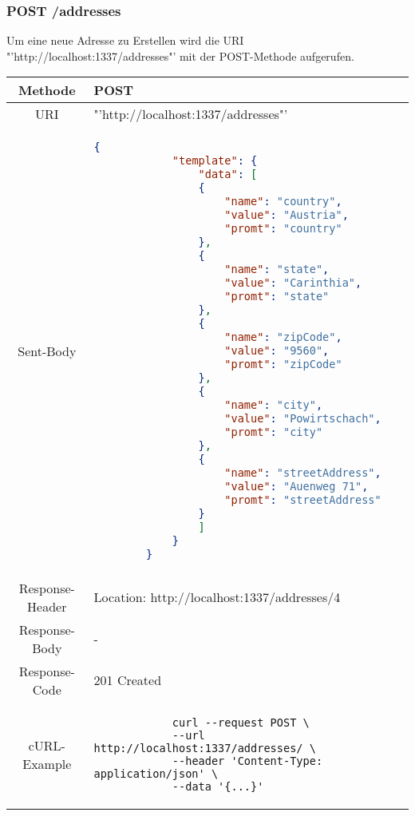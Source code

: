 \documentclass[listof=totoc]{article}
\begin{document}
	\subsubsection{POST /addresses}
	Um eine neue Adresse zu Erstellen wird die \ac{URI} "'http://localhost:1337/addresses"' mit der POST-Methode aufgerufen.
	\newline
	\begin{tabular}{|c|p{10cm}|}
		\hline 
		Methode & POST \\ 
		\hline 
		\ac{URI} & "'http://localhost:1337/addresses"' \\ 
		\hline 
		Sent-Body &  
		\begin{lstlisting}[language=json]
		{
			"template": {
				"data": [
				{
					"name": "country",
					"value": "Austria",
					"promt": "country"
				},
				{
					"name": "state",
					"value": "Carinthia",
					"promt": "state"
				},
				{
					"name": "zipCode",
					"value": "9560",
					"promt": "zipCode"
				},
				{
					"name": "city",
					"value": "Powirtschach",
					"promt": "city"
				},
				{
					"name": "streetAddress",
					"value": "Auenweg 71",
					"promt": "streetAddress"
				}
				]
			}
		}
		\end{lstlisting} \\ 
		\hline 
		Response-Header & Location: http://localhost:1337/addresses/4 \\ 
		\hline 
		Response-Body & - \\ 
		\hline 
		Response-Code & 201 Created \\ 
		\hline 
		cURL-Example &  
		\begin{verbatim}
			curl --request POST \
			--url http://localhost:1337/addresses/ \
			--header 'Content-Type: application/json' \
			--data '{...}'
		\end{verbatim}
		\\ 
		\hline 
	\end{tabular} 
	\newpage
	
\end{document}
